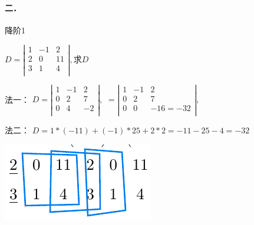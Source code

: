 \documentclass[printbox]{BHCexam}
\begin{document}
\paragraph{二．}降阶1
\begin{questions}
\question
$D=\left|
\begin{array}{ccc}
  1&-1&2\\
  2&0&11\\
  3&1&4\\
\end{array}\right|,\text{求}D$
\end{questions}
\begin{solution}

 法一： $D=\left|
\begin{array}{ccc}
  1&-1&2\\
  0&2&7\\
  0&\boxed{4}&-2\\
\end{array}\right|,$
$=\left|
\begin{array}{ccc}
  1&-1&2\\
  0&2&7\\
  0&0&-16=-32\\
\end{array}\right|,$

法二： $D=1*(-11)+(-1)*25+2*2=-11-25-4=-32$

\includegraphics[scale=0.5]{assets/1-2.png}



\end{solution}
\end{document}
